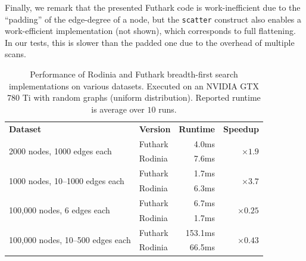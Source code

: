 Finally, we remark that the presented Futhark code is work-inefficient
due to the ``padding'' of the edge-degree of a node, but the
\lstinline{scatter} construct also enables a work-efficient
implementation (not shown), which corresponds to full flattening. In
our tests, this is slower than the padded one due to the overhead of
multiple scans.
%

\begin{table}
  \centering
  \begin{tabular}{llrr}
    \textbf{Dataset} & \textbf{Version} & \textbf{Runtime} & \textbf{Speedup} \\

    \multirow{2}{*}{2000 nodes, 1000 edges each} & Futhark & 4.0ms & \multirow{2}{*}{$\times1.9$} \\\cline{2-3}
                     & Rodinia & 7.6ms \\\hline

    \multirow{2}{*}{1000 nodes, 10--1000 edges each} & Futhark & 1.7ms & \multirow{2}{*}{$\times3.7$} \\\cline{2-3}
                     & Rodinia & 6.3ms \\\hline

    \multirow{2}{*}{100,000 nodes, 6 edges each} & Futhark & 6.7ms & \multirow{2}{*}{$\times0.25$} \\\cline{2-3}
                     & Rodinia & 1.7ms \\\hline

    \multirow{2}{*}{100,000 nodes, 10--500 edges each} & Futhark & 153.1ms & \multirow{2}{*}{$\times0.43$} \\\cline{2-3}
                     & Rodinia & 66.5ms \\\hline

  \end{tabular}
  \caption{Performance of Rodinia and Futhark breadth-first search
    implementations on various datasets. Executed on an NVIDIA GTX 780
    Ti with random graphs (uniform distribution).  Reported runtime is
    average over $10$ runs.}
  \label{fig:bfs-speedup}
\end{table}

